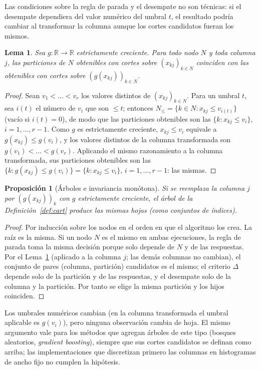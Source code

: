 \documentclass[11pt,a4paper]{article}
\theoremstyle{plain}
\newtheorem{proposicion}[teorema]{Proposición}
\newtheorem{lema}[teorema]{Lema}
\theoremstyle{definition}
\theoremstyle{remark}
\newcommand{\R}{\mathbb{R}}
\newcommand{\1}{\mathbf{1}}
\begin{document}
Las condiciones sobre la regla de parada y el desempate no son técnicas:
si el desempate dependiera del valor numérico del umbral $t$, el resultado
podría cambiar al transformar la columna aunque los cortes candidatos
fueran los mismos.

\begin{lema}\label{lem:cortes}
Sea $g:\R\to\R$ estrictamente creciente. Para todo nodo $N$ y toda columna
$j$, las particiones de $N$ obtenibles con cortes sobre
$(x_{kj})_{k\in N}$ coinciden con las obtenibles con cortes sobre
$(g(x_{kj}))_{k\in N}$.
\end{lema}

\begin{proof}
Sean $v_1<\dots<v_r$ los valores distintos de $(x_{kj})_{k\in N}$. Para
un umbral $t$, sea $i(t)$ el número de $v_i$ que son $\le t$; entonces
$N_\le=\{k\in N:x_{kj}\le v_{i(t)}\}$ (vacío si $i(t)=0$), de modo que las
particiones obtenibles son las
$\{k:x_{kj}\le v_i\}$, $i=1,\dots,r-1$. Como $g$ es estrictamente
creciente, $x_{kj}\le v_i$ equivale a $g(x_{kj})\le g(v_i)$, y los valores
distintos de la columna transformada son $g(v_1)<\dots<g(v_r)$. Aplicando
el mismo razonamiento a la columna transformada, sus particiones
obtenibles son las $\{k:g(x_{kj})\le g(v_i)\}=\{k:x_{kj}\le v_i\}$,
$i=1,\dots,r-1$: las mismas.
\end{proof}

\begin{proposicion}[Árboles e invariancia monótona]\label{prop:arbol}
Si se reemplaza la columna $j$ por $(g(x_{kj}))_k$ con $g$ estrictamente
creciente, el árbol de la Definición~\ref{def:cart} produce las mismas
hojas (como conjuntos de índices).
\end{proposicion}

\begin{proof}
Por inducción sobre los nodos en el orden en que el algoritmo los crea.
La raíz es la misma. Si un nodo $N$ es el mismo en ambas ejecuciones, la
regla de parada toma la misma decisión porque solo depende de $N$ y de las
respuestas. Por el Lema~\ref{lem:cortes} (aplicado a la columna $j$; las
demás columnas no cambian), el conjunto de pares (columna, partición)
candidatos es el mismo; el criterio $\Delta$ depende solo de la partición
y de las respuestas, y el desempate solo de la columna y la partición. Por
tanto se elige la misma partición y los hijos coinciden.
\end{proof}

Los umbrales numéricos cambian (en la columna transformada el umbral
aplicable es $g(v_i)$), pero ninguna observación cambia de hoja. El mismo
argumento vale para los métodos que agregan árboles de este tipo (bosques
aleatorios, \emph{gradient boosting}), siempre que sus cortes candidatos se
definan como arriba; las implementaciones que discretizan primero las
columnas en histogramas de ancho fijo no cumplen la hipótesis.
\end{document}

